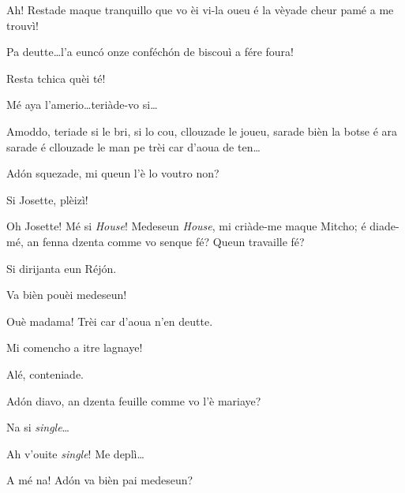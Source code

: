 \begin{drama}
\Gerominespeaks Ah! Restade maque tranquillo que vo èi vi-la oueu é la vèyade cheur pamé a me trouvì!

\Casimirspeaks Pa deutte\ldots l’a eunc\'o onze conféch\'on de biscouì a fére foura!

\Gerominespeaks Resta tchica quèi té!


\MedMitchospeaks{} Mé aya l'amerio\ldots teriàde-vo si\ldots


\MedMitchospeaks Amoddo, teriade si le bri, si lo cou, cllouzade le joueu, sarade bièn la botse é ara sarade é cllouzade le man pe trèi car d'aoua de ten\ldots 


\MedMitchospeaks{} Ad\'on squezade, mi queun l'è lo voutro non?

\Feliespeaks Si Josette, plèizì!

\MedMitchospeaks Oh Josette! Mé si \textit{House}! Medeseun \textit{House}, mi criàde-me maque Mitcho; é diade-mé, an fenna dzenta comme vo senque fé? Queun travaille fé?

\Feliespeaks Si dirijanta eun Réj\'on.

\Gerominespeaks{} Va bièn pouèi medeseun!

\MedMitchospeaks Ouè madama! Trèi car d'aoua n'en deutte.

\Gerominespeaks Mi comencho a itre lagnaye!

\MedMitchospeaks Alé, conteniade.


\MedMitchospeaks{} Ad\'on diavo, an dzenta feuille comme vo l'è mariaye?

\Feliespeaks Na si \textit{single}\ldots

\MedMitchospeaks Ah v'ouite \textit{single}! Me deplì\ldots

\Gerominespeaks A mé na! Ad\'on va bièn pai medeseun?


\end{drama}
